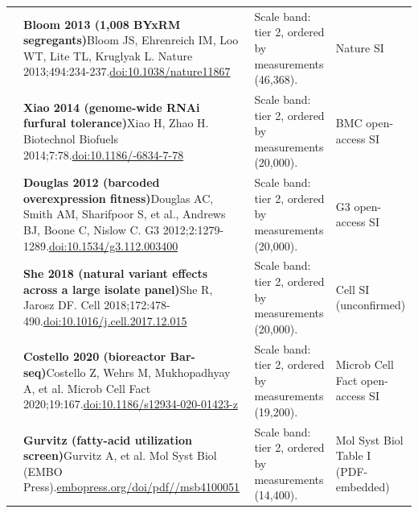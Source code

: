 \begin{landscape}
\begin{longtable}{@{}r@{\hspace{4pt}} L{86mm} L{92mm} L{62mm}@{}}
 & \textbf{Bloom 2013 (1,008 BYxRM segregants)}\newline Bloom JS, Ehrenreich IM, Loo WT, Lite TL, Kruglyak L. Nature 2013;494:234-237.\newline \href{https://doi.org/10.1038/nature11867}{doi:10.1038/\allowbreak nature11867} & Scale band: tier 2, ordered by measurements (46,368). & Nature SI \\
 & \textbf{Xiao 2014 (genome-wide RNAi furfural tolerance)}\newline Xiao H, Zhao H. Biotechnol Biofuels 2014;7:78.\newline \href{https://doi.org/10.1186/1754-6834-7-78}{doi:10.1186/-6834-7-78} & Scale band: tier 2, ordered by measurements (20,000). & BMC open-access SI \\
 & \textbf{Douglas 2012 (barcoded overexpression fitness)}\newline Douglas AC, Smith AM, Sharifpoor S, et al., Andrews BJ, Boone C, Nislow C. G3 2012;2:1279-1289.\newline \href{https://doi.org/10.1534/g3.112.003400}{doi:10.1534/\allowbreak g3.112.003400} & Scale band: tier 2, ordered by measurements (20,000). & G3 open-access SI \\
 & \textbf{She 2018 (natural variant effects across a large isolate panel)}\newline She R, Jarosz DF. Cell 2018;172:478-490.\newline \href{https://doi.org/10.1016/j.cell.2017.12.015}{doi:10.1016/\allowbreak j.cell.2017.12.015} & Scale band: tier 2, ordered by measurements (20,000). & Cell SI (unconfirmed) \\
 & \textbf{Costello 2020 (bioreactor Bar-seq)}\newline Costello Z, Wehrs M, Mukhopadhyay A, et al. Microb Cell Fact 2020;19:167.\newline \href{https://doi.org/10.1186/s12934-020-01423-z}{doi:10.1186/\allowbreak s12934-020-01423-z} & Scale band: tier 2, ordered by measurements (19,200). & Microb Cell Fact open-access SI \\
 & \textbf{Gurvitz (fatty-acid utilization screen)}\newline Gurvitz A, et al. Mol Syst Biol (EMBO Press).\newline \href{https://www.embopress.org/doi/pdf/10.1038/msb4100051}{embopress.org/\allowbreak doi/\allowbreak pdf//\allowbreak msb4100051} & Scale band: tier 2, ordered by measurements (14,400). & Mol Syst Biol Table I (PDF-embedded) \\

\end{longtable}
\end{landscape}
